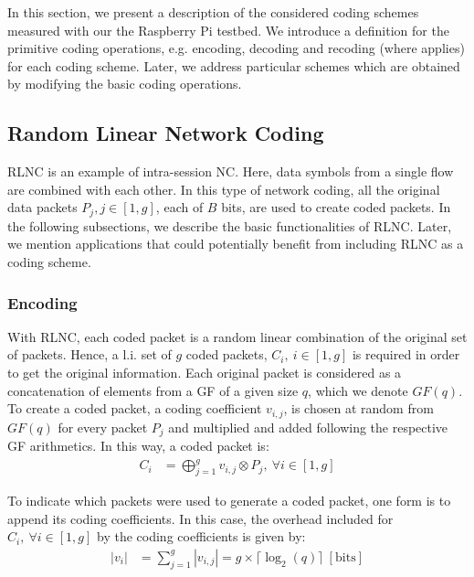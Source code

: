 \label{sec:schemes}

In this section, we present a description of the considered coding schemes
measured with our the Raspberry Pi testbed. We introduce a definition
for the primitive coding operations, e.g. encoding, decoding and recoding
(where applies) for each coding scheme. Later, we address particular schemes
which are obtained by modifying the basic coding operations.

\subsection{Random Linear Network Coding}

\ac{RLNC} is an example of intra-session \ac{NC}. Here, data symbols from a
single flow are combined with each other. In this type of network coding,
all the original data packets $P_j, j \in [1,g]$, each of $B$ bits, are used
to create coded packets. In the following subsections, we describe the
basic functionalities of \ac{RLNC}. Later, we mention applications that could
potentially benefit from including \ac{RLNC} as a coding scheme.

\subsubsection{Encoding}
With \ac{RLNC}, each coded packet is a random linear
combination of the original set of packets. Hence,
a \ac{l.i.} set of $g$ coded packets, $C_i,\ i \in [1,g]$
is required in order to get the original information.
Each original packet is considered as a concatenation of elements
from a \ac{GF} of a given size $q$, which we denote
$GF(q)$. To create a coded packet, a coding coefficient
$v_{i,j}$, is chosen at random from $GF(q)$ for every
packet $P_j$ and multiplied and added
following the respective \ac{GF} arithmetics. In this way,
a coded packet is:
%
\begin{align} \label{eq:coded_packet}
C_i  &= \bigoplus_{j=1}^{g} v_{i,j} \otimes P_j ,\ \forall i \in [1,g]
\end{align}

To indicate which packets were used to generate a coded packet, one
form is to append its coding coefficients. In this case, the overhead
included for $C_i,\ \forall i \in [1,g]$ by the coding coefficients
is given by:
%
\begin{align} \label{eq:coded_packet_coef}
|v_i| &= \sum_{j=1}^{g} |v_{i,j}| = g \times \lceil \log_{2} (q)
\rceil ~ [\mathrm{bits}]
\end{align}

